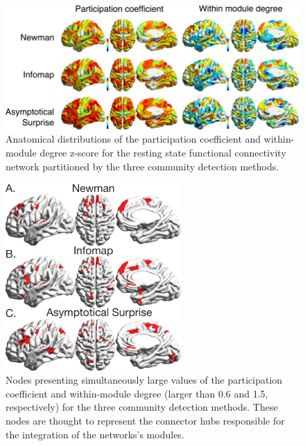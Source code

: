 \begin{figure}[!htb]
\centering
\includegraphics[width=1\textwidth]{images/pacopaperfigure8.pdf}
\caption{Anatomical distributions of the participation coefficient and within-module degree z-score for the resting state functional connectivity network partitioned by the three community detection methods.}
\label{fig:hubclassification}
\end{figure}
\begin{figure}[!htb]
\centering
\includegraphics[width=0.6\textwidth]{images/pacopaperfigure9.pdf}
\caption{Nodes presenting simultaneously large values of the participation coefficient and within-module degree (larger than 0.6 and 1.5, respectively) for the three community detection methods. These nodes are thought to represent the connector hubs responsible for the integration of the networks's modules.
}
\label{fig:hubclassification_threshold}
\end{figure}

